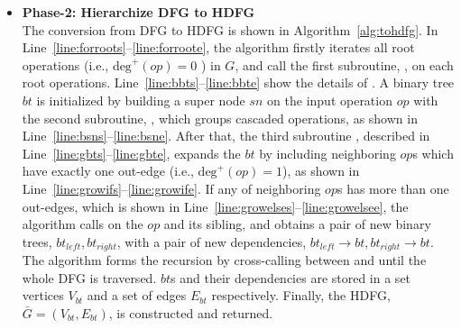 \begin{itemize}
    \item \textbf{Phase-2: Hierarchize DFG to HDFG} \\\indent
        The conversion from DFG to HDFG is shown in Algorithm~\ref{alg:tohdfg}.
        In Line~\ref{line:forroots}--\ref{line:forroote}, the algorithm firstly iterates all root operations (i.e., $\textrm{deg}^+(op)=0$ ) in $G$,
        and call the first subroutine, , on each root operations.
        Line~\ref{line:bbts}--\ref{line:bbte} show the details of .
        A binary tree $bt$ is initialized by building a super node $sn$ on the input operation $op$ with the second subroutine, 
        , which groups cascaded operations, as shown in Line~\ref{line:bsns}--\ref{line:bsne}.  
        After that, the third subroutine , described in Line~\ref{line:gbts}--\ref{line:gbte}, 
        expands the $bt$ by including neighboring $op$s which have exactly one out-edge (i.e., $\textrm{deg}^+(op)=1$), as shown in Line~\ref{line:growifs}--\ref{line:growife}.  
        If any of neighboring $op$s has more than one out-edges, 
        which is shown in Line~\ref{line:growelses}--\ref{line:growelsee}, 
        the algorithm calls  on the $op$ and its sibling, and obtains a pair of new binary trees, $bt_{left}, bt_{right}$, 
        with a pair of new dependencies, $bt_{left} \rightarrow bt, bt_{right} \rightarrow bt$.
        The algorithm forms the recursion by cross-calling between  and  until the whole DFG is traversed.
        $bt$s and their dependencies are stored in a set vertices $V_{bt}$ and a set of edges $E_{bt}$ respectively.
        Finally, the HDFG, $\bar{G} = ( V_{bt} , E_{bt} )$, is constructed and returned.
\end{itemize}

